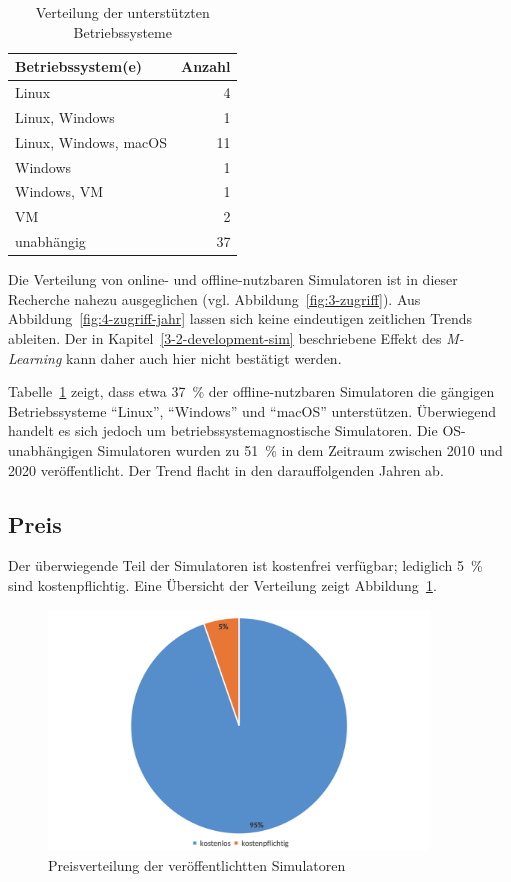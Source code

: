 \begin{table}[h]
	\centering
	\caption{Verteilung der unterstützten Betriebssysteme}
	\label{tab:os}
	\begin{tabular}{l r}
		\toprule
		\textbf{Betriebssystem(e)} & \textbf{Anzahl} \\
		\midrule
		Linux                     & 4  \\
		Linux, Windows            & 1  \\
		Linux, Windows, macOS     & 11 \\
		Windows                   & 1  \\
		Windows, \ac{VM}          & 1  \\
		\ac{VM}                   & 2  \\
		unabhängig                & 37 \\
		\bottomrule
	\end{tabular}
\end{table}

Die Verteilung von online- und offline-nutzbaren Simulatoren ist in dieser Recherche nahezu ausgeglichen (vgl. Abbildung~\ref{fig:3-zugriff}). Aus Abbildung~\ref{fig:4-zugriff-jahr} lassen sich keine eindeutigen zeitlichen Trends ableiten. Der in Kapitel~\ref{3-2-development-sim} beschriebene Effekt des \textit{M-Learning} kann daher auch hier nicht bestätigt werden.

Tabelle~\ref{tab:os} zeigt, dass etwa 37~\% der offline-nutzbaren Simulatoren die gängigen Betriebssysteme \enquote{Linux}, \enquote{Windows} und \enquote{macOS} unterstützen. Überwiegend handelt es sich jedoch um betriebssystemagnostische Simulatoren. Die OS-unabhängigen Simulatoren wurden zu 51~\% in dem Zeitraum zwischen 2010 und 2020 veröffentlicht. Der Trend flacht in den darauffolgenden Jahren ab.

\subsection{Preis}

Der überwiegende Teil der Simulatoren ist kostenfrei verfügbar; lediglich 5~\% sind kostenpflichtig. Eine Übersicht der Verteilung zeigt Abbildung~\ref{fig:9-preis}.

\begin{figure}[!htbp]
    \centering
    \includegraphics[width=0.90\textwidth]{graphics_sim/9-preis.png}
    \caption{Preisverteilung der veröffentlichtten Simulatoren}
    \label{fig:9-preis}
\end{figure}

